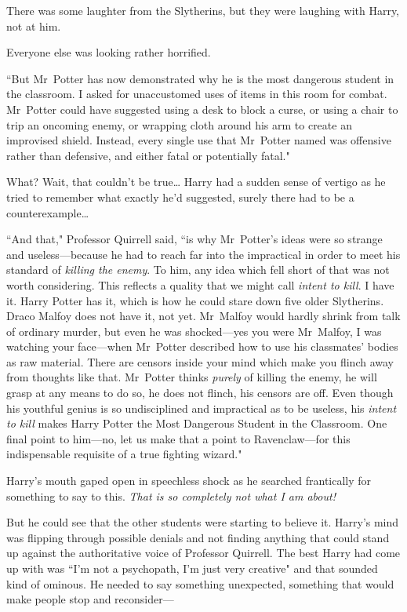There was some laughter from the Slytherins, but they were laughing with Harry, not at him.

Everyone else was looking rather horrified.

``But Mr~Potter has now demonstrated why he is the most dangerous student in the classroom. I asked for unaccustomed uses of items in this room for combat. Mr~Potter could have suggested using a desk to block a curse, or using a chair to trip an oncoming enemy, or wrapping cloth around his arm to create an improvised shield. Instead, every single use that Mr~Potter named was offensive rather than defensive, and either fatal or potentially fatal."

What? Wait, that couldn't be true{\ldots} Harry had a sudden sense of vertigo as he tried to remember what exactly he'd suggested, surely there had to be a counterexample{\ldots}

``And that," Professor Quirrell said, ``is why Mr~Potter's ideas were so strange and useless—because he had to reach far into the impractical in order to meet his standard of \emph{killing the enemy}. To him, any idea which fell short of that was not worth considering. This reflects a quality that we might call \emph{intent to kill}. I have it. Harry Potter has it, which is how he could stare down five older Slytherins. Draco Malfoy does not have it, not yet. Mr~Malfoy would hardly shrink from talk of ordinary murder, but even he was shocked—yes you were Mr~Malfoy, I was watching your face—when Mr~Potter described how to use his classmates' bodies as raw material. There are censors inside your mind which make you flinch away from thoughts like that. Mr~Potter thinks \emph{purely} of killing the enemy, he will grasp at any means to do so, he does not flinch, his censors are off. Even though his youthful genius is so undisciplined and impractical as to be useless, his \emph{intent to kill} makes Harry Potter the Most Dangerous Student in the Classroom. One final point to him—no, let us make that a point to Ravenclaw—for this indispensable requisite of a true fighting wizard."

Harry's mouth gaped open in speechless shock as he searched frantically for something to say to this. \emph{That is so completely not what I am about!}

But he could see that the other students were starting to believe it. Harry's mind was flipping through possible denials and not finding anything that could stand up against the authoritative voice of Professor Quirrell. The best Harry had come up with was ``I'm not a psychopath, I'm just very creative" and that sounded kind of ominous. He needed to say something unexpected, something that would make people stop and reconsider—

